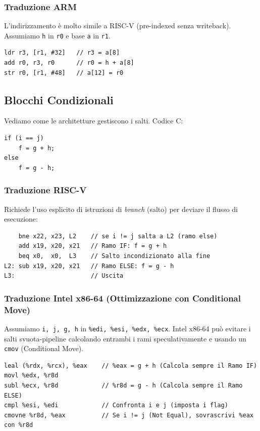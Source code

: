 \documentclass[12pt, a4paper]{article}
\begin{document}
\subsubsection{Traduzione ARM}
L'indirizzamento è molto simile a RISC-V (pre-indexed senza writeback). Assumiamo \texttt{h} in \texttt{r0} e base \texttt{a} in \texttt{r1}.
\begin{verbatim}
ldr r3, [r1, #32]   // r3 = a[8]
add r0, r3, r0      // r0 = h + a[8]
str r0, [r1, #48]   // a[12] = r0
\end{verbatim}

\subsection{Blocchi Condizionali}
Vediamo come le architetture gestiscono i salti.
Codice C:
\begin{verbatim}
if (i == j)
    f = g + h;
else
    f = g - h;
\end{verbatim}

\subsubsection{Traduzione RISC-V}
Richiede l'uso esplicito di istruzioni di \textit{branch} (salto) per deviare il flusso di esecuzione:
\begin{verbatim}
    bne x22, x23, L2    // se i != j salta a L2 (ramo else)
    add x19, x20, x21   // Ramo IF: f = g + h
    beq x0,  x0,  L3    // Salto incondizionato alla fine
L2: sub x19, x20, x21   // Ramo ELSE: f = g - h
L3:                     // Uscita
\end{verbatim}

\subsubsection{Traduzione Intel x86-64 (Ottimizzazione con Conditional Move)}
Assumiamo \texttt{i, j, g, h} in \texttt{\%edi, \%esi, \%edx, \%ecx}. Intel x86-64 può evitare i salti svuota-pipeline calcolando entrambi i rami speculativamente e usando un \texttt{cmov} (Conditional Move).
\begin{verbatim}
leal (%rdx, %rcx), %eax    // %eax = g + h (Calcola sempre il Ramo IF)
movl %edx, %r8d            
subl %ecx, %r8d            // %r8d = g - h (Calcola sempre il Ramo ELSE)
cmpl %esi, %edi            // Confronta i e j (imposta i flag)
cmovne %r8d, %eax          // Se i != j (Not Equal), sovrascrivi %eax con %r8d
\end{verbatim}
\end{document}
